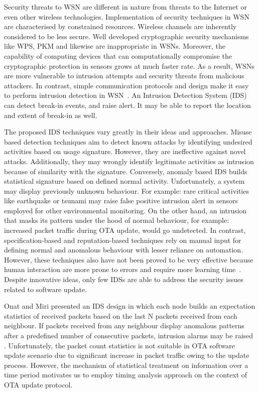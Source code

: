 \documentclass[conference]{IEEEtran}
\begin{document}
Security threats to WSN are different in nature from threats to the Internet or even other wireless technologies. %
Implementation of security techniques in WSN are characterised by constrained resources.
Wireless channels are inherently considered to be less secure.
Well developed cryptographic security mechanisms like WPS, PKM and likewise are inappropriate in WSNs.
Moreover, the capability of computing devices that can computationally compromise the cryptographic protection in sensors grows at much faster rate.
As a result, WSNs are more vulnerable to intrusion attempts and security threats from malicious attackers.
In contrast, simple communication protocols and design make it easy to perform intrusion detection in WSN~\cite{quing09}.
An Intrusion Detection System (IDS) can detect  break-in events, and raise alert.%
It may be able to report the location and extent of break-in as well.


The proposed IDS techniques vary greatly in their ideas and approaches.
Misuse based  detection  techniques aim to detect known attacks by identifying undesired activities based on usage signature.
However, they are ineffective against novel attacks.
Additionally, they may wrongly identify legitimate activities as intrusion because of similarity with the signature.
Conversely, anomaly based IDS builds statistical signature based on defined normal activity.
Unfortunately, a system may display previously unknown behaviour.
For example: rare critical activities like earthquake or tsunami may raise false positive intrusion alert in sensors employed for other environmental monitoring.
On the other hand, an intrusion that masks its pattern under the hood of normal behaviour, for example: increased packet traffic during OTA update, would go undetected.
In contrast, specification-based and reputation-based techniques rely on manual input for defining normal and anomalous behaviour with lesser reliance on automation.
However, these techniques also have not been proved to be very effective because human interaction are more prone to errors and require more learning time~\cite{quing09}. 
Despite innovative ideas, only few IDSs are able to address the security issues related to software update.

Onat and Miri presented an IDS design in which each node builds an expectation statistics of received packets based on the last N packets received from each neighbour.
If packets received from any neighbour display anomalous patterns after a predefined number of consecutive packets, intrusion alarms may be raised \cite{1512911}.
Unfortunately, the  packet count statistics is not suitable in OTA software update scenario due to significant increase in packet traffic owing to the update process. 
However, the mechanism of statistical treatment on information over a time period motivates us to employ timing analysis approach on the context of OTA update protocol.
\end{document}
